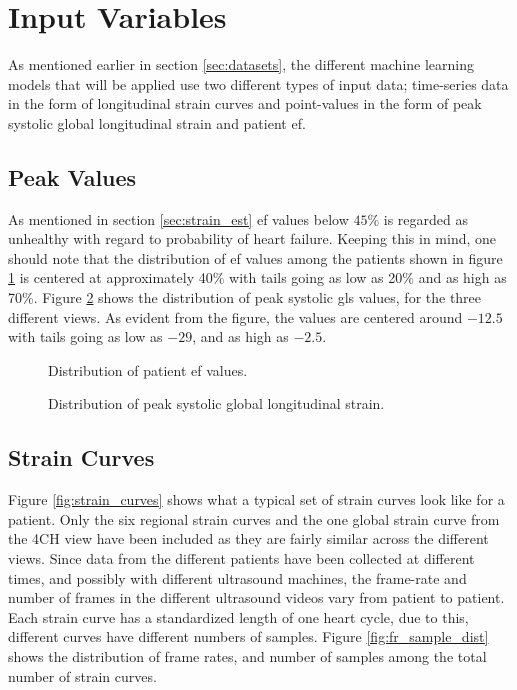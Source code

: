 \section{Input Variables} \label{sec:covariates}
As mentioned earlier in section \ref{sec:datasets}, the different machine learning models that will be applied use two different types of input data; time-series data in the form of longitudinal strain curves and point-values in the form of peak systolic global longitudinal strain and patient \acrshort{ef}. \bigskip

\subsection{Peak Values}
As mentioned in section \ref{sec:strain_est} \acrshort{ef} values below $45\%$ is regarded as unhealthy with regard to probability of heart failure. Keeping this in mind, one should note that the distribution of \acrshort{ef} values among the patients shown in figure \ref{fig:EF_dist} is centered at approximately 40$\%$ with tails going as low as 20$\%$ and as high as 70$\%$. Figure \ref{fig:gls_dist} shows the distribution of peak systolic \acrshort{gls} values, for the three different views. As evident from the figure, the values are centered around $-12.5$ with tails going as low as $-29$, and as high as $-2.5$. \bigskip

\begin{figure}[h]
    \centering
    
    \caption{Distribution of patient \acrshort{ef} values.}
    \label{fig:EF_dist}
\end{figure}

\begin{figure}
    \centering
    
    \caption{Distribution of peak systolic global longitudinal strain.}
    \label{fig:gls_dist}
\end{figure}

\clearpage

\subsection{Strain Curves}
Figure \ref{fig:strain_curves} shows what a typical set of strain curves look like for a patient. Only the six regional strain curves and the one global strain curve from the 4CH view have been included as they are fairly similar across the different views. Since data from the different patients have been collected at different times, and possibly with different ultrasound machines, the frame-rate and number of frames in the different ultrasound videos vary from patient to patient. Each strain curve has a standardized length of one heart cycle, due to this, different curves have different numbers of samples. Figure \ref{fig:fr_sample_dist} shows the distribution of frame rates, and number of samples among the total number of strain curves. \bigskip

